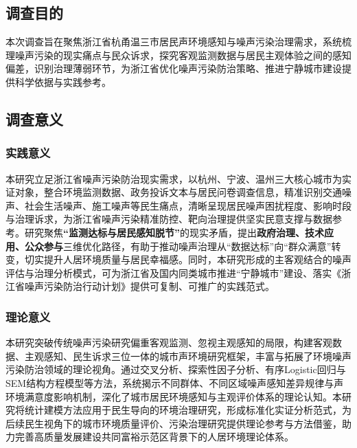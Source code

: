 \subsection{调查目的}

本次调查旨在聚焦浙江省杭甬温三市居民声环境感知与噪声污染治理需求，系统梳理噪声污染的现实痛点与民众诉求，探究客观监测数据与居民主观体验之间的感知偏差，识别治理薄弱环节，为浙江省优化噪声污染防治策略、推进宁静城市建设提供科学依据与实践参考。

\subsection{调查意义}

\subsubsection{实践意义}


本研究立足浙江省噪声污染防治现实需求，以杭州、宁波、温州三大核心城市为实证对象，整合环境监测数据、政务投诉文本与居民问卷调查信息，精准识别交通噪声、社会生活噪声、施工噪声等民生痛点，清晰呈现居民噪声困扰程度、影响时段与治理诉求，为浙江省噪声污染精准防控、靶向治理提供坚实民意支撑与数据参考。研究聚焦\textbf{“监测达标与居民感知脱节”}的现实矛盾，提出\textbf{政府治理、技术应用、公众参与}三维优化路径，有助于推动噪声治理从“数据达标”向“群众满意”转变，切实提升人居环境质量与居民幸福感。同时，本研究形成的主客观结合的噪声评估与治理分析模式，可为浙江省及国内同类城市推进“宁静城市”建设、落实《浙江省噪声污染防治行动计划》提供可复制、可推广的实践范式。

\subsubsection{理论意义}

本研究突破传统噪声污染研究偏重客观监测、忽视主观感知的局限，构建客观数据、主观感知、民生诉求三位一体的城市声环境研究框架，丰富与拓展了环境噪声污染防治领域的理论视角。通过交叉分析、探索性因子分析、有序Logistic回归与SEM结构方程模型等方法，系统揭示不同群体、不同区域噪声感知差异规律与声环境满意度影响机制，深化了城市居民环境感知与主观评价体系的理论认知。本研究将统计建模方法应用于民生导向的环境治理研究，形成标准化实证分析范式，为后续民生视角下的城市环境质量评价、污染治理研究提供理论参考与方法借鉴，助力完善高质量发展建设共同富裕示范区背景下的人居环境理论体系。

